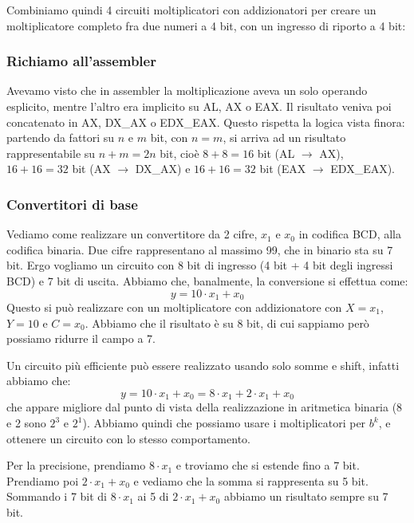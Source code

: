 \documentclass[a4paper,11pt]{article}
\begin{document}
Combiniamo quindi 4 circuiti moltiplicatori con addizionatori per creare un moltiplicatore completo fra due numeri a 4 bit, con un ingresso di riporto a 4 bit:



\subsubsection{Richiamo all'assembler}
Avevamo visto che in assembler la moltiplicazione aveva un solo operando esplicito, mentre l'altro era implicito su AL, AX o EAX.
Il risultato veniva poi concatenato in AX, DX\_AX o EDX\_EAX.
Questo rispetta la logica vista finora: partendo da fattori su $n$ e $m$ bit, con $n = m$, si arriva ad un risultato rappresentabile su $n + m = 2n$ bit, cioè $8 + 8 = 16$ bit (AL $\rightarrow$ AX), $16 + 16 = 32$ bit (AX $\rightarrow$ DX\_AX) e $16 + 16 = 32$ bit (EAX $\rightarrow$ EDX\_EAX).

\subsubsection{Convertitori di base}
Vediamo come realizzare un convertitore da 2 cifre, $x_1$ e $x_0$ in codifica BCD, alla codifica binaria.
Due cifre rappresentano al massimo 99, che in binario sta su 7 bit.
Ergo vogliamo un circuito con 8 bit di ingresso (4 bit + 4 bit degli ingressi BCD) e 7 bit di uscita.
Abbiamo che, banalmente, la conversione si effettua come:
$$
y = 10 \cdot x_1 + x_0 
$$
Questo si può realizzare con un moltiplicatore con addizionatore con $X=x_1$, $Y=10$ e $C=x_0$.
Abbiamo che il risultato è su 8 bit, di cui sappiamo però possiamo ridurre il campo a 7.
\par\smallskip 
Un circuito più efficiente può essere realizzato usando solo somme e shift, infatti abbiamo che:
$$ y = 10 \cdot x_1 + x_ 0 = 8 \cdot x_1 + 2 \cdot x_1 + x_0 $$
che appare migliore dal punto di vista della realizzazione in aritmetica binaria (8 e 2 sono $2^3$ e $2^1$).
Abbiamo quindi che possiamo usare i moltiplicatori per $b^k$, e ottenere un circuito con lo stesso comportamento.

Per la precisione, prendiamo $8 \cdot x_1$ e troviamo che si estende fino a 7 bit.
Prendiamo poi  $2 \cdot x_1 + x_0$ e vediamo che la somma si rappresenta su 5 bit.
Sommando i 7 bit di $8 \cdot x_1$ ai 5 di $2 \cdot x_1 + x_0$ abbiamo un risultato sempre su 7 bit.
\end{document}
